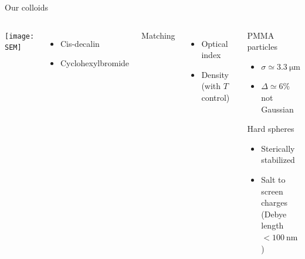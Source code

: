 \documentclass{beamer}
\begin{document}
\begin{frame}{Our colloids}
	\begin{columns}
	\begin{center}
	\texttt{[image: SEM]}
	\end{center}
	\begin{itemize}
		\item Cis-decalin
		\item Cyclohexylbromide
	\end{itemize}
	Matching
	\begin{itemize}
		\item Optical index
		\item Density (with $T$ control)
	\end{itemize}
	\begin{block}{PMMA particles}
		\begin{itemize}
			\item $\sigma \simeq \SI{3.3}{\micro\metre}$
			\item $\Delta \simeq 6\%$ not Gaussian
		\end{itemize}
		Hard spheres
		\begin{itemize}
			\item Sterically stabilized
			\item Salt to screen charges\\ (Debye length $<\SI{100}{\nano\metre}$)
		\end{itemize}
	\end{block}
	\end{columns}
\end{frame}
\end{document}

